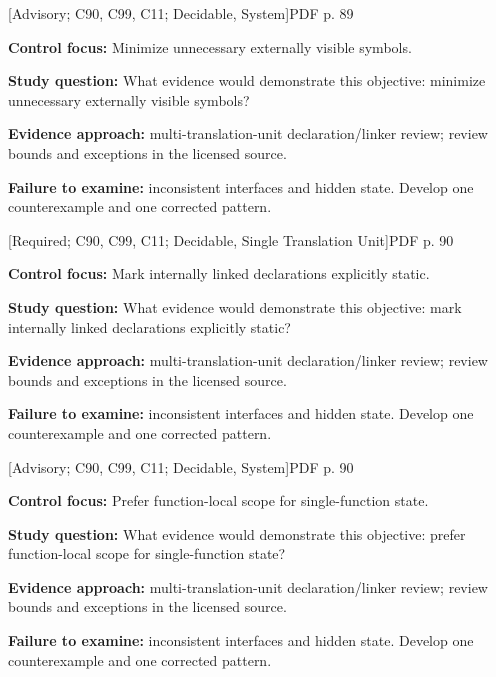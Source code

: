 \documentclass[10pt,letterpaper]{article}
\begin{document}
\smallskip
{}
 \textsf{\footnotesize [Advisory; C90, C99, C11; Decidable, System]}\hfill{\footnotesize PDF p. 89}\par
\textbf{Control focus:} Minimize unnecessary externally visible symbols.\par
\textbf{Study question:} What evidence would demonstrate this objective: minimize unnecessary externally visible symbols?\par
\textbf{Evidence approach:} multi-translation-unit declaration/linker review; review bounds and exceptions in the licensed source.\par
\textbf{Failure to examine:} inconsistent interfaces and hidden state. Develop one counterexample and one corrected pattern.\par
\smallskip
{}
 \textsf{\footnotesize [Required; C90, C99, C11; Decidable, Single Translation Unit]}\hfill{\footnotesize PDF p. 90}\par
\textbf{Control focus:} Mark internally linked declarations explicitly static.\par
\textbf{Study question:} What evidence would demonstrate this objective: mark internally linked declarations explicitly static?\par
\textbf{Evidence approach:} multi-translation-unit declaration/linker review; review bounds and exceptions in the licensed source.\par
\textbf{Failure to examine:} inconsistent interfaces and hidden state. Develop one counterexample and one corrected pattern.\par
\smallskip
{}
 \textsf{\footnotesize [Advisory; C90, C99, C11; Decidable, System]}\hfill{\footnotesize PDF p. 90}\par
\textbf{Control focus:} Prefer function-local scope for single-function state.\par
\textbf{Study question:} What evidence would demonstrate this objective: prefer function-local scope for single-function state?\par
\textbf{Evidence approach:} multi-translation-unit declaration/linker review; review bounds and exceptions in the licensed source.\par
\textbf{Failure to examine:} inconsistent interfaces and hidden state. Develop one counterexample and one corrected pattern.\par
\end{document}
